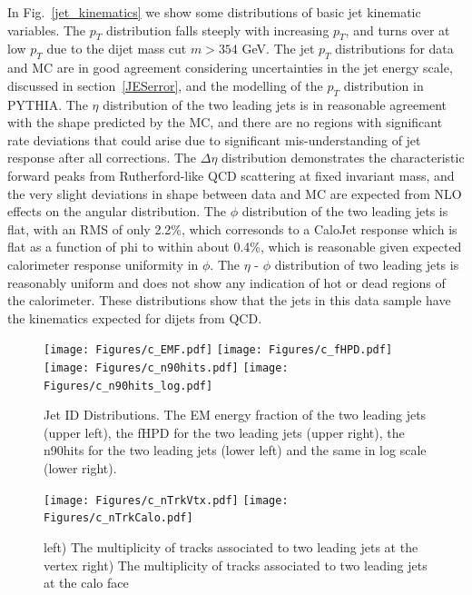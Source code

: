 In Fig.~\ref{jet_kinematics} we show some distributions of basic jet
kinematic variables.  The $p_T$ distribution falls steeply with increasing
$p_T$, and turns over at low $p_T$ due to the dijet mass cut $m>354$ GeV.
The jet $p_T$ distributions for data and MC are in good agreement considering
uncertainties in the jet energy scale, discussed in section~\ref{JESerror}, 
and the modelling of the $p_T$ distribution
in PYTHIA.
The $\eta$ distribution of the two leading jets is in reasonable agreement with 
the shape predicted by the MC, and there are no regions with significant
rate deviations that could arise due to significant mis-understanding of jet response
after all corrections. The $\Delta\eta$ distribution demonstrates the 
characteristic forward peaks from Rutherford-like QCD scattering at 
fixed invariant mass, and the very slight deviations in shape between
data and MC are expected from NLO effects on the angular distribution.
The $\phi$ distribution of the two leading jets is flat, with an RMS of
only 2.2\%, which corresonds to a CaloJet response which is flat as a function of phi 
to within about 0.4\%, which is reasonable given expected calorimeter response uniformity in $\phi$. 
The $\eta$ - $\phi$ distribution of two leading jets is reasonably uniform and 
does not show any indication of hot or dead regions of the calorimeter. 
These distributions show that the jets in this data sample 
have the kinematics expected for dijets from QCD.

\begin{figure}[!ht]
  \begin{center}
    \texttt{[image: Figures/c\_EMF.pdf]}
    \texttt{[image: Figures/c\_fHPD.pdf]}
    \texttt{[image: Figures/c\_n90hits.pdf]}
    \texttt{[image: Figures/c\_n90hits\_log.pdf]}

    \caption{Jet ID Distributions.  The EM
      energy fraction of the two leading jets (upper left), the fHPD for the two
      leading jets (upper right), the n90hits for the two leading jets
      (lower left) and the same in log scale
      (lower right). }
    \label{jet_id}
  \end{center}
\end{figure}

\begin{figure}[!ht]
  \begin{center}
    \texttt{[image: Figures/c\_nTrkVtx.pdf]}
    \texttt{[image: Figures/c\_nTrkCalo.pdf]}
    \caption{ left) The multiplicity of tracks associated to two leading jets at the vertex right) The multiplicity of tracks associated to two leading jets at the calo face}
    \label{track_multiplicity}
  \end{center}
\end{figure}

